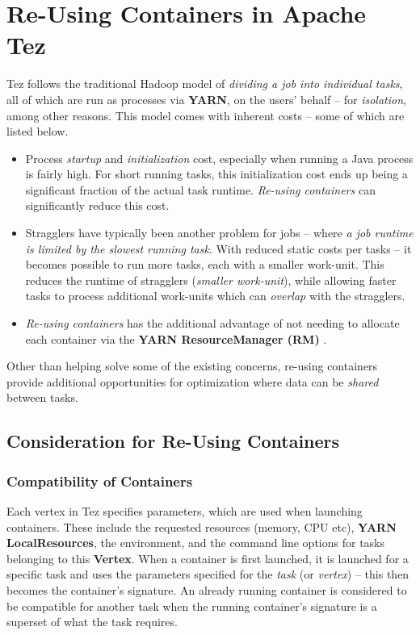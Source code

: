 \documentclass[twocolumn]{article}
\begin{document}
\section{Re-Using Containers in Apache Tez}

Tez follows the traditional Hadoop model of \emph{dividing a job into
individual tasks}, all of which are run as processes via \textbf{YARN},
on the users' behalf -- for \emph{isolation}, among other reasons. This
model comes with inherent costs -- some of which are listed below.

\begin{itemize}
\item
  Process \emph{startup} and \emph{initialization} cost, especially when
  running a Java process is fairly high. For short running tasks, this
  initialization cost ends up being a significant fraction of the actual
  task runtime. \emph{Re-using containers} can significantly reduce this
  cost.
\item
  Stragglers have typically been another problem for jobs -- where
  \emph{a job runtime is limited by the slowest running task}. With
  reduced static costs per tasks -- it becomes possible to run more
  tasks, each with a smaller work-unit. This reduces the runtime of
  stragglers (\emph{smaller work-unit}), while allowing faster tasks to
  process additional work-units which can \emph{overlap} with the
  stragglers.
\item
  \emph{Re-using containers} has the additional advantage of not needing
  to allocate each container via the \textbf{YARN ResourceManager (RM)} \cite{Saha:2013-06}.
\end{itemize}

Other than helping solve some of the existing concerns, re-using
containers provide additional opportunities for optimization where data
can be \emph{shared} between tasks.

\subsection{Consideration for Re-Using Containers}

\subsubsection*{Compatibility of Containers} 
Each vertex in Tez specifies parameters, which are used when launching
containers. These include the requested resources (memory, CPU etc),
\textbf{YARN LocalResources}, the environment, and the command line
options for tasks belonging to this \textbf{Vertex}. When a container is
first launched, it is launched for a specific task and uses the
parameters specified for the \emph{task} (or \emph{vertex}) -- this then
becomes the container's signature. An already running container is
considered to be compatible for another task when the running
container's signature is a superset of what the task requires.
\end{document}
